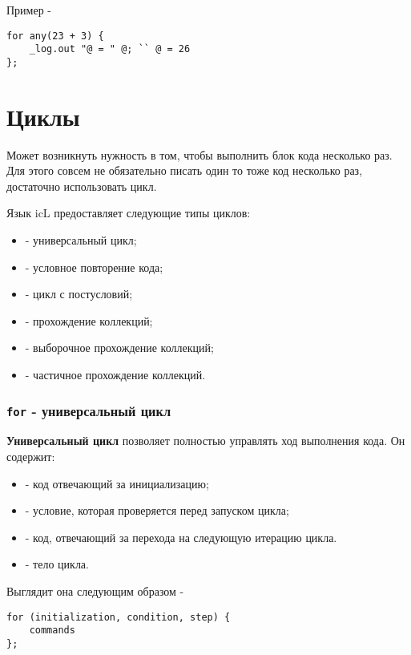 \documentclass[a4paper, 14pt]{extarticle}
\newenvironment{icItems}
	{ \begin{itemize} [noitemsep,nolistsep] }
	{ \end{itemize} }
\begin{document}
\noindent Пример -
\begin{lstlisting}[numbers=none]
for any(23 + 3) {
	_log.out "@ = " @; `` @ = 26
};
\end{lstlisting}

\newpage
\section{Циклы}

Может возникнуть нужность в том, чтобы выполнить блок кода несколько раз. Для этого совсем не обязательно писать один то тоже код несколько раз, достаточно использовать цикл.
	
Язык icL предоставляет следующие типы циклов:
	
\begin{icItems}
	\item {} - универсальный цикл;
	\item {} - условное повторение кода;
	\item {} - цикл с постусловий;
	\item {} - прохождение коллекций;
	\item {} - выборочное прохождение коллекций;
	\item {} - частичное прохождение коллекций.
\end{icItems}
	

\subsubsection{\lstinline`for` - универсальный цикл}

{\bf Универсальный цикл} позволяет полностью управлять ход выполнения кода. Он содержит:

\begin{icItems}
	\item {} - код отвечающий за инициализацию;
	\item {} - условие, которая проверяется перед запуском цикла;
	\item {} - код, отвечающий за перехода на следующую итерацию цикла.
	\item {} - тело цикла.
\end{icItems}

\noindent Выглядит она следующим образом -
\begin{lstlisting}[numbers=none]
for (initialization, condition, step) {
	commands
};
\end{lstlisting}
\end{document}
